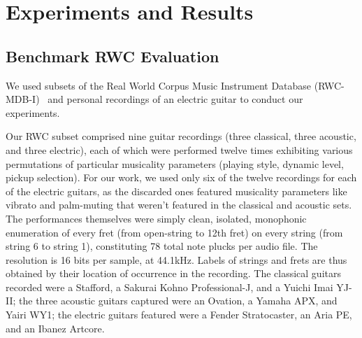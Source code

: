 \documentclass[12pt]{cmuthesis}
\begin{document}
\noindent
\chapter{Experiments and Results}
\label{chap:experiments}
\section{Benchmark RWC Evaluation}

We used subsets of the Real World Corpus Music Instrument Database (RWC-MDB-I)~\cite{goto2003} and personal recordings of an electric guitar to conduct our experiments. 

Our RWC subset comprised nine guitar recordings (three classical, three acoustic, and three electric), each of which were performed twelve times exhibiting various permutations of particular musicality parameters (playing style, dynamic level, pickup selection). For our work, we used only six of the twelve recordings for each of the electric guitars, as the discarded ones featured musicality parameters like vibrato and palm-muting that weren't featured in the classical and acoustic sets. The performances themselves were simply clean, isolated, monophonic enumeration of every fret (from open-string to 12th fret) on every string (from string 6 to string 1), constituting 78 total note plucks per audio file. The resolution is 16 bits per sample, at 44.1kHz. Labels of strings and frets are thus obtained by their location of occurrence in the recording. The classical guitars recorded were a Stafford, a Sakurai Kohno Professional-J, and a Yuichi Imai YJ-II; the three acoustic guitars captured were an Ovation, a Yamaha APX, and Yairi WY1; the electric guitars featured were a Fender Stratocaster, an Aria PE, and an Ibanez Artcore.

\end{document}
